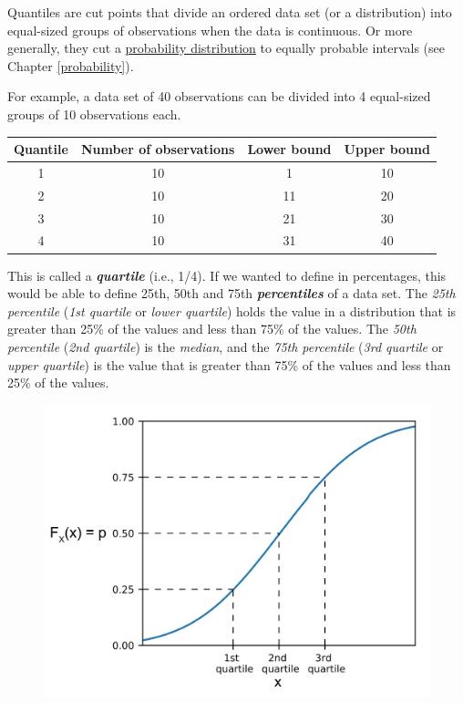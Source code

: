 \documentclass[
  11pt,
]{book}
\theoremstyle{indenteddefinition}
\theoremstyle{indenteddefinition}
\theoremstyle{definition}
\theoremstyle{definition}
\theoremstyle{remark}
\begin{document}
\hypertarget{calloutquantile}{}
\begin{callout}[Quantiles]

Quantiles are cut points that divide an ordered data set (or a distribution) into equal-sized groups of observations when the data is continuous. Or more generally, they cut a \protect\hyperlink{probability}{probability distribution} to equally probable intervals (see Chapter \ref{probability}).

For example, a data set of 40 observations can be divided into 4 equal-sized groups of 10 observations each.

\begin{table}[H]
\centering
\begin{tabular}{cccc}
\toprule
Quantile & Number of observations & Lower bound & Upper bound\\
\midrule
1 & 10 & 1 & 10\\
2 & 10 & 11 & 20\\
3 & 10 & 21 & 30\\
4 & 10 & 31 & 40\\
\bottomrule
\end{tabular}
\end{table}

This is called a \textbf{\emph{quartile}} (i.e., 1/4). If we wanted to define in percentages, this would be able to define 25th, 50th and 75th \textbf{\emph{percentiles}} of a data set. The \emph{25th percentile} (\emph{1st quartile} or \emph{lower quartile}) holds the value in a distribution that is greater than 25\% of the values and less than 75\% of the values. The \emph{50th percentile} (\emph{2nd quartile}) is the \emph{median}, and the \emph{75th percentile} (\emph{3rd quartile} or \emph{upper quartile}) is the value that is greater than 75\% of the values and less than 25\% of the values.

\begin{figure}

{\centering \includegraphics[width=0.45\linewidth]{resources/image/1920px-NormalCDFQuartile3} 

}
\end{figure}
\end{callout}
\end{document}
